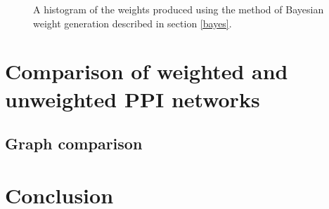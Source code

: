 \begin{figure}
    \centering
    \setlength\figureheight{3in}
    \setlength\figurewidth{4in}
    \caption{A histogram of the weights produced using the method of Bayesian weight generation described in section \ref{bayes}.}
    \label{fig:weightdist}
\end{figure}


\section{Comparison of weighted and unweighted PPI networks}




\subsection{Graph comparison}


\section*{Conclusion}


